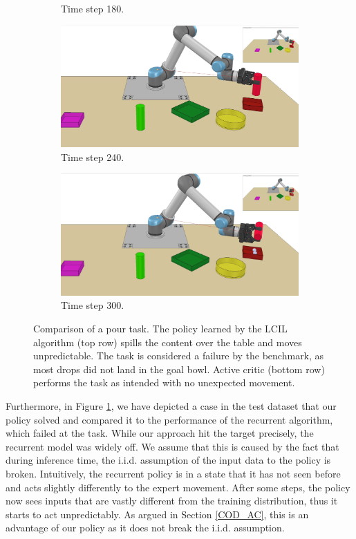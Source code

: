 \begin{figure}
\begin{subfigure}[t]{0.18\textwidth}
        \caption{Time step 180.}
    \end{subfigure}
    \begin{subfigure}[t]{0.18\textwidth}
        \includegraphics[width=\linewidth]{images/Language_Conditioned_Exp/mine_4.png}
        \caption{Time step 240.}
    \end{subfigure}
    \begin{subfigure}[t]{0.18\textwidth}
        \includegraphics[width=\linewidth]{images/Language_Conditioned_Exp/mine_5.png}
        \caption{Time step 300.}
    \end{subfigure}
    \caption{Comparison of a pour task. The policy learned by the LCIL algorithm (top row) spills the content over the table and moves unpredictable. The task is considered a failure 
    by the benchmark, as most drops did not land in the goal bowl. Active critic (bottom row) performs the task as intended with no unexpected movement.}
    \label{fig: AVC vs. Rec}
\end{figure}
Furthermore, in Figure \ref{fig: AVC vs. Rec}, we have depicted a case in the test dataset that our policy solved and compared it to the performance 
of the recurrent algorithm, which failed at the task.
While our approach hit the target precisely, the recurrent model was widely off. We assume that this is caused by the fact that during inference 
time, the
i.i.d. assumption of the input data to the policy is broken. Intuitively, the recurrent policy
is in a state that it has not seen before and acts slightly differently to the expert movement. After some steps, the policy now sees 
inputs that are vastly
different from the training distribution, thus it starts to act unpredictably. As argued in Section \ref{COD_AC}, this is an advantage of our 
policy as it
does not break the i.i.d. assumption.

